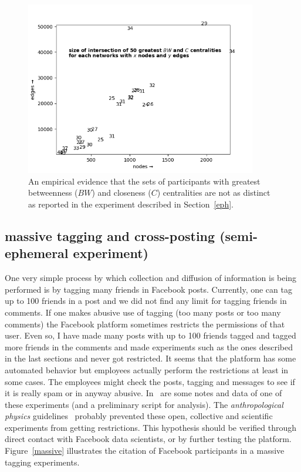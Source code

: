 \documentclass[a4paper]{article}
\begin{document}
\begin{figure}[H]
  \centering
    \includegraphics[width=0.9\textwidth]{netHip}
  \caption{An empirical evidence that the sets of participants with greatest betweenness ($BW$) and closeness ($C$) centralities are not as distinct as reported in the experiment described in Section~\ref{eph}.}\label{nh}
\end{figure}

\subsection{massive tagging and cross-posting (semi-ephemeral experiment)}\label{mass}
One very simple process by which collection and diffusion of information is being performed
is by tagging many friends in Facebook posts.
Currently, one can tag up to 100 friends in a post
and we did not find any limit for tagging friends in comments.
If one makes abusive use of tagging (too many posts or too many comments)
the Facebook platform sometimes restricts the permissions of that user.
Even so, I have made many posts with up to 100 friends tagged and tagged more
friends in the comments and made experiments such as the ones described in the
last sections and never got restricted.
It seems that the platform has some automated behavior but employees actually
perform the restrictions at least in some cases.
The employees might check the posts, tagging and messages to see if it is
really spam or in anyway abusive.
In~\cite{anExp} are some notes and data of one of these experiments (and a preliminary script for analysis).
The \emph{anthropological physics} guidelines~\cite{anPhy,anPhy2} probably prevented
these open, collective and scientific experiments from getting restrictions.
This hypothesis should be verified through direct contact with Facebook data scientists,
or by further testing the platform.
Figure~\ref{massive} illustrates the citation of Facebook participants in a massive tagging experiments.
\end{document}
